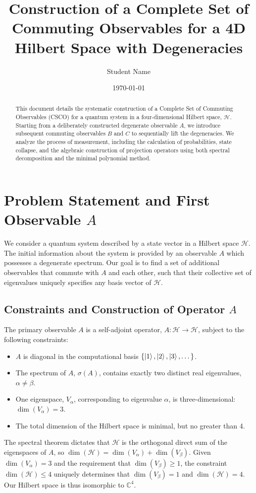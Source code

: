 \documentclass[11pt,a4paper]{article}
\title{Construction of a Complete Set of Commuting Observables for a 4D Hilbert Space with Degeneracies}
\author{Student Name}
\date{\today}
\begin{document}
\maketitle

\begin{abstract}
This document details the systematic construction of a Complete Set of Commuting Observables (CSCO) for a quantum system in a four-dimensional Hilbert space, $\mathcal{H}$. Starting from a deliberately constructed degenerate observable $A$, we introduce subsequent commuting observables $B$ and $C$ to sequentially lift the degeneracies. We analyze the process of measurement, including the calculation of probabilities, state collapse, and the algebraic construction of projection operators using both spectral decomposition and the minimal polynomial method.
\end{abstract}

\section{Problem Statement and First Observable \texorpdfstring{$A$}{A}}

We consider a quantum system described by a state vector in a Hilbert space $\mathcal{H}$. The initial information about the system is provided by an observable $A$ which possesses a degenerate spectrum. Our goal is to find a set of additional observables that commute with $A$ and each other, such that their collective set of eigenvalues uniquely specifies any basis vector of $\mathcal{H}$.

\subsection{Constraints and Construction of Operator \texorpdfstring{$A$}{A}}
The primary observable $A$ is a self-adjoint operator, $A: \mathcal{H} \to \mathcal{H}$, subject to the following constraints:
\begin{itemize}
    \item $A$ is diagonal in the computational basis $\{\ket{1}, \ket{2}, \ket{3}, \dots\}$.
    \item The spectrum of $A$, $\sigma(A)$, contains exactly two distinct real eigenvalues, $\alpha \neq \beta$.
    \item One eigenspace, $V_\alpha$, corresponding to eigenvalue $\alpha$, is three-dimensional: $\dim(V_\alpha) = 3$.
    \item The total dimension of the Hilbert space is minimal, but no greater than 4.
\end{itemize}
The spectral theorem dictates that $\mathcal{H}$ is the orthogonal direct sum of the eigenspaces of $A$, so $\dim(\mathcal{H}) = \dim(V_\alpha) + \dim(V_\beta)$. Given $\dim(V_\alpha) = 3$ and the requirement that $\dim(V_\beta) \ge 1$, the constraint $\dim(\mathcal{H}) \le 4$ uniquely determines that $\dim(V_\beta) = 1$ and $\dim(\mathcal{H}) = 4$. Our Hilbert space is thus isomorphic to $\mathbb{C}^4$.
\end{document}
